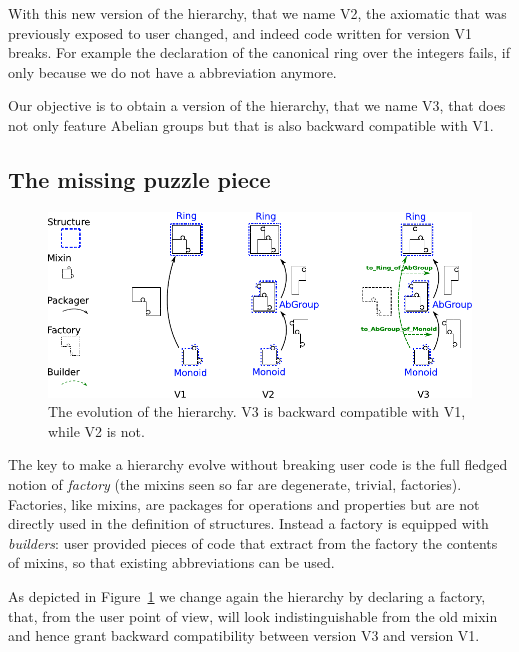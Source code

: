 \documentclass[a4paper,UKenglish,cleveref, autoref]{lipics-v2019}
\newcommand{\mixin}{mixin}
\newcommand{\mixins}{mixins}
\newcommand{\factory}{factory}
\newcommand{\factories}{factories}
\newcommand{\Factories}{Factories}
\newcommand{\phantterm}{abbreviation}
\newcommand{\builder}{builder}
\theoremstyle{implem}
\theoremstyle{implem}
\theoremstyle{command}
\theoremstyle{commands}
\begin{document}
With this new version of the hierarchy, that we name V2, the axiomatic that
was previously exposed to user changed, and indeed
code written for version V1 breaks. For example the declaration of the
canonical ring over the integers fails, if only
because we do not have a  \phantterm{}
anymore.

Our objective is to obtain a version of the hierarchy, that we name V3, that does
not only feature Abelian groups but that is also backward compatible
with V1.

\subsection{The missing puzzle piece}\label{subsec:v3}

\begin{figure}[!h]
  \begin{center}
    \includegraphics[width=\textwidth]{puzzle.pdf}
  \end{center}
  \caption{\label{fig:puzzle}The evolution of the hierarchy. V3 is backward compatible with V1, while V2 is not.}
\end{figure}

The key to make a hierarchy evolve without breaking user code is the full
fledged notion of \emph{\factory{}} (the \mixins{} seen so far are degenerate,
trivial, \factories{}).
\Factories{}, like \mixins{}, are packages for operations and properties but are
not directly used in the definition of structures. Instead a \factory{} is
equipped with \emph{\builder{}s}: user provided pieces of code that extract
from the \factory{} the contents of \mixins{}, so that existing
\phantterm{}s can be used.

As depicted in Figure~\ref{fig:puzzle} we change again the hierarchy
by declaring a  \factory{}, that, from the user point of view,
will look indistinguishable from the old  \mixin{}
and hence grant backward compatibility between version V3 and version V1.
\end{document}
